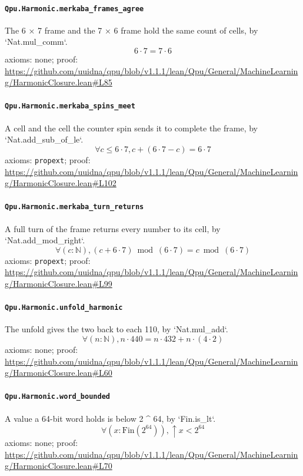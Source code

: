 \documentclass[11pt]{article}
\begin{document}
\paragraph{\texttt{Qpu.Harmonic.merkaba\_frames\_agree}}
The 6 × 7 frame and the 7 × 6 frame hold the same count of cells, by `Nat.mul\_comm`.
\[ 6 \cdot 7 = 7 \cdot 6 \]
\noindent axioms: none; proof: \url{https://github.com/uuidna/qpu/blob/v1.1.1/lean/Qpu/General/MachineLearning/HarmonicClosure.lean\#L85}

\paragraph{\texttt{Qpu.Harmonic.merkaba\_spins\_meet}}
A cell and the cell the counter spin sends it to complete the frame, by `Nat.add\_sub\_of\_le`.
\[ \forall c \le 6 \cdot 7, c + (6 \cdot 7 - c) = 6 \cdot 7 \]
\noindent axioms: \texttt{propext}; proof: \url{https://github.com/uuidna/qpu/blob/v1.1.1/lean/Qpu/General/MachineLearning/HarmonicClosure.lean\#L102}

\paragraph{\texttt{Qpu.Harmonic.merkaba\_turn\_returns}}
A full turn of the frame returns every number to its cell, by `Nat.add\_mod\_right`.
\[ \forall (c : \mathbb{N}), (c + 6 \cdot 7) \bmod (6 \cdot 7) = c \bmod (6 \cdot 7) \]
\noindent axioms: \texttt{propext}; proof: \url{https://github.com/uuidna/qpu/blob/v1.1.1/lean/Qpu/General/MachineLearning/HarmonicClosure.lean\#L99}

\paragraph{\texttt{Qpu.Harmonic.unfold\_harmonic}}
The unfold gives the two back to each 110, by `Nat.mul\_add`.
\[ \forall (n : \mathbb{N}), n \cdot 440 = n \cdot 432 + n \cdot (4 \cdot 2) \]
\noindent axioms: none; proof: \url{https://github.com/uuidna/qpu/blob/v1.1.1/lean/Qpu/General/MachineLearning/HarmonicClosure.lean\#L60}

\paragraph{\texttt{Qpu.Harmonic.word\_bounded}}
A value a 64-bit word holds is below 2 \^{} 64, by `Fin.is\_lt`.
\[ \forall (x : \mathrm{Fin} (2 ^{64})), \uparrow x < 2 ^{64} \]
\noindent axioms: none; proof: \url{https://github.com/uuidna/qpu/blob/v1.1.1/lean/Qpu/General/MachineLearning/HarmonicClosure.lean\#L70}
\end{document}
